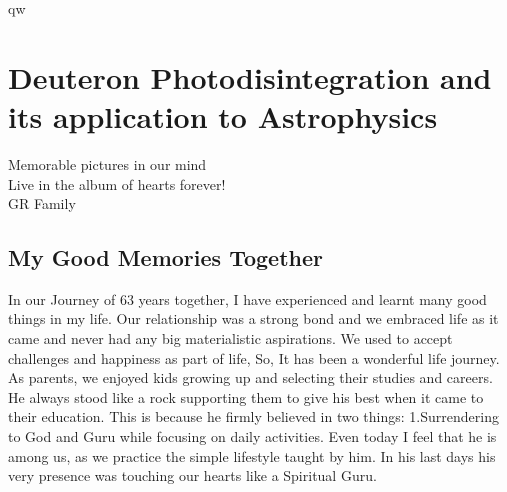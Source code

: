 qw\chapter[Our Fond Memories of GR]{Deuteron Photodisintegration and its application to Astrophysics}\label{chap20}


\begin{center}
Memorable pictures in our mind\\
Live in the album of hearts forever!\\
GR Family
\end{center}

\begin{figure}[H]
\end{figure}

\section*{My Good Memories Together}

In our Journey of 63 years together, I have experienced and learnt many good things in my life. Our relationship was a strong bond and we embraced life as it came and never had any big materialistic aspirations. We used to accept challenges and happiness as part of life, So, It has been a wonderful life journey. As parents, we enjoyed kids growing up and selecting their studies and careers. He always stood like a rock supporting them to give his best when it came to their education. This is because he firmly believed in two things: 1.Surrendering to God and Guru while focusing on daily activities. Even today I feel that he is among us, as we practice the simple lifestyle taught by him. In his last days his very presence was touching our hearts like a Spiritual Guru. 

